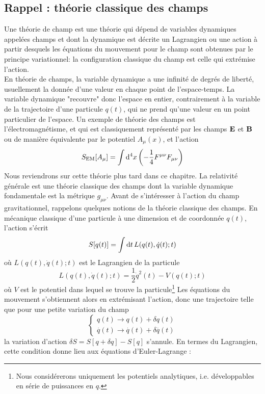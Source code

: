 \subsection{Rappel : théorie classique des champs}
Une théorie de champ est une théorie qui dépend de variables dynamiques appelées champs et dont la dynamique est décrite un Lagrangien ou une action à partir desquels les équations du mouvement pour le champ sont obtenues par le principe variationnel: la configuration classique du champ est celle qui extrémise l'action. \\
En théorie de champs, la variable dynamique a une infinité de degrés de liberté, usuellement la donnée d'une valeur en chaque point de l'espace-temps. La variable dynamique "recouvre" donc l'espace en entier, contrairement à la variable de la trajectoire d'une particule $q(t)$, qui ne prend qu'une valeur en un point particulier de l'espace. Un exemple de théorie des champs est l'électromagnétisme, et qui est classiquement représenté par les champs $\bm{\mathrm{E}}$ et $\bm{\mathrm{B}}$ ou de manière équivalente par le potentiel $A_\mu(x)$, et l'action
\begin{equation}
    S_{\text{EM}}[A_\mu] = \int \mathrm{d}^4 x \left( - \frac{1}{4} F^{\mu\nu} F_{\mu\nu} \right) 
\end{equation}
Nous reviendrons sur cette théorie plus tard dans ce chapitre.
\cutebreak
La relativité générale est une théorie classique des champs dont la variable dynamique fondamentale est la métrique $g_{\mu \nu}$. Avant de s'intéresser à l'action du champ gravitationnel, rappelons quelques notions de la théorie classique des champs. En mécanique classique d'une particule à une dimension et de coordonnée $q(t)$, l'action s'écrit
\begin{equation}
    S[q(t)] = \int \mathrm{d} t \, L(q(t), \dot q(t); t)
\end{equation}
où $L(q(t), \dot q (t); t)$ est le Lagrangien de la particule 
\begin{equation}
    L(q(t), \dot q(t); t) = \frac{1}{2}\dot q^2(t) - V(q(t); t)
\end{equation}
où $V$ est le potentiel dans lequel se trouve la particule\footnote{Nous considérerons uniquement les potentiels analytiques, i.e. développables en série de puissances en $q$.} Les équations du mouvement s'obtiennent alors en extrémisant l'action, donc une trajectoire telle que pour une petite variation du champ
\begin{equation}
\left\{
\begin{array}{l}
q(t) \rightarrow q(t) + \delta q(t)\\
\overset{.}{q}(t) \rightarrow \overset{.}{q}(t) + \delta \overset{.}{q} (t)
\end{array}
\right.
\end{equation}
la variation d'action $\delta S = S[q + \delta q] -S[q]$ s'annule. En termes du Lagrangien, cette condition donne lieu aux équations d'Euler-Lagrange :

